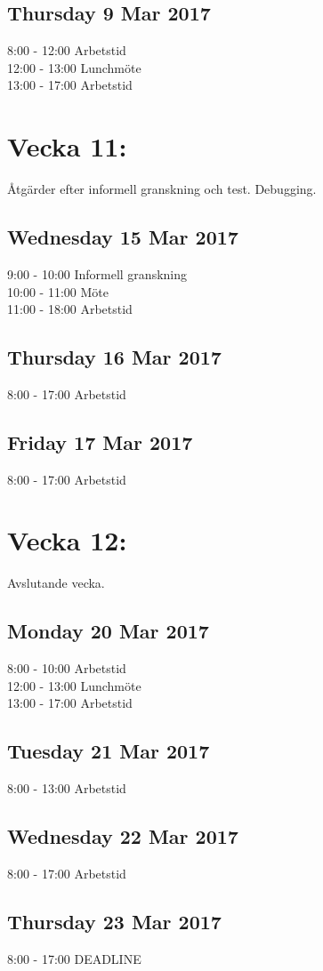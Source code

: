 \documentclass[paper=a4, fontsize=11pt,twoside]{article}
\begin{document}
\subsection*{Thursday 9 Mar 2017}
	8:00 - 12:00 Arbetstid\\
	12:00 - 13:00 Lunchmöte\\
	13:00 - 17:00 Arbetstid\\



\section*{Vecka 11:}
Åtgärder efter informell granskning och test. Debugging.\\
\subsection*{Wednesday 15 Mar 2017}
	9:00 - 10:00 Informell granskning\\
	10:00 - 11:00 Möte\\
	11:00 - 18:00 Arbetstid\\
\subsection*{Thursday 16 Mar 2017}
	8:00 - 17:00 Arbetstid\\
\subsection*{Friday 17 Mar 2017}
	8:00 - 17:00 Arbetstid\\



\section*{Vecka 12:}
Avslutande vecka.\\
\subsection*{Monday 20 Mar 2017}
	8:00 - 10:00 Arbetstid\\
	12:00 - 13:00 Lunchmöte\\
	13:00 - 17:00 Arbetstid\\
\subsection*{Tuesday 21 Mar 2017}
	8:00 - 13:00 Arbetstid\\
\subsection*{Wednesday 22 Mar 2017}
	8:00 - 17:00 Arbetstid\\
\subsection*{Thursday 23 Mar 2017}
	8:00 - 17:00 DEADLINE\\
\end{document}
